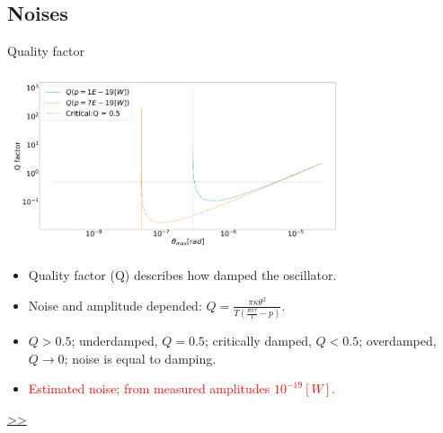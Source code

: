 \documentclass{beamer}
\begin{document}
\subsection{Noises}

\begin{frame}{\hypertarget{frame:Quality factor}{Quality factor}}
	\begin{center}		
		\includegraphics[width=0.75\textwidth,keepaspectratio]{Q factor.png}
	\end{center}
	\begin{itemize}	
		\item Quality factor (Q) describes how damped the oscillator.
		\item Noise and amplitude depended: $Q =  \frac{\pi\kappa\theta^2}{T(\frac{\theta\pi\tau}{T} -p)} $.
		\item $Q>0.5$; underdamped, $Q=0.5$; critically damped, $Q<0.5$; overdamped, $Q\rightarrow 0$; noise is equal to damping. 
		\item \textcolor{red}{Estimated noise; from measured amplitudes $10^{-19}[W]$.} 
	\end{itemize}
	\hyperlink{frame:Quality factor 1}{>>} 
\end{frame}
\end{document}
